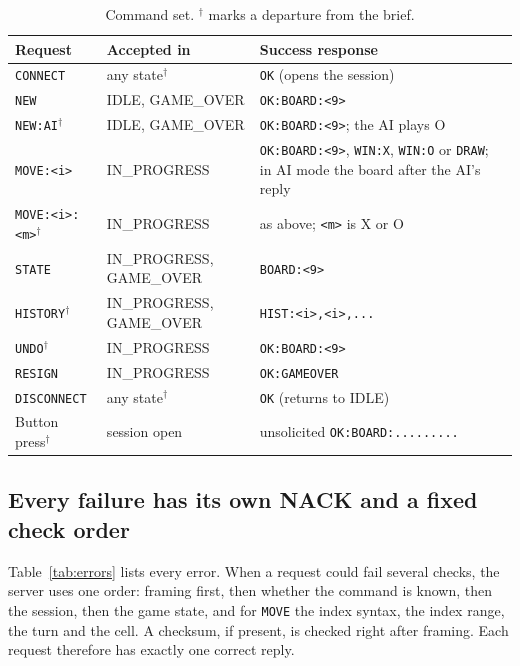 \begin{table}[t]
\centering
\caption{Command set. $^\dagger$ marks a departure from the brief.}
\label{tab:commands}
\scriptsize
\begin{tabular}{@{}L{1.9cm}L{1.8cm}L{4.3cm}@{}}
\toprule
Request & Accepted in & Success response \\
\midrule
\texttt{CONNECT} & any state$^\dagger$ & \texttt{OK} (opens the session) \\
\texttt{NEW} & IDLE, GAME\_OVER & \texttt{OK:BOARD:<9>} \\
\texttt{NEW:AI}$^\dagger$ & IDLE, GAME\_OVER & \texttt{OK:BOARD:<9>}; the AI plays O \\
\texttt{MOVE:<i>} & IN\_PROGRESS & \texttt{OK:BOARD:<9>}, \texttt{WIN:X}, \texttt{WIN:O} or \texttt{DRAW}; in AI mode the board after the AI's reply \\
\texttt{MOVE:<i>:<m>}$^\dagger$ & IN\_PROGRESS & as above; \texttt{<m>} is X or O \\
\texttt{STATE} & IN\_PROGRESS, GAME\_OVER & \texttt{BOARD:<9>} \\
\texttt{HISTORY}$^\dagger$ & IN\_PROGRESS, GAME\_OVER & \texttt{HIST:<i>,<i>,...} \\
\texttt{UNDO}$^\dagger$ & IN\_PROGRESS & \texttt{OK:BOARD:<9>} \\
\texttt{RESIGN} & IN\_PROGRESS & \texttt{OK:GAMEOVER} \\
\texttt{DISCONNECT} & any state$^\dagger$ & \texttt{OK} (returns to IDLE) \\
Button press$^\dagger$ & session open & unsolicited \texttt{OK:BOARD:.........} \\
\bottomrule
\end{tabular}
\end{table}

\subsection{Every failure has its own NACK and a fixed check order}
Table~\ref{tab:errors} lists every error. When a request could fail several
checks, the server uses one order: framing first, then whether the command is
known, then the session, then the game state, and for \texttt{MOVE} the index
syntax, the index range, the turn and the cell. A checksum, if present, is
checked right after framing. Each request therefore has
exactly one correct reply.

